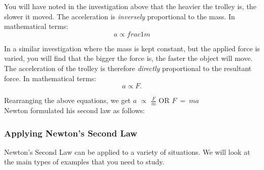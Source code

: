 You will have noted in the investigation above that the heavier the trolley is, the slower it moved. The acceleration is \textit{inversely} proportional to the mass. In mathematical terms:
\begin{equation*}
a \propto frac{1}{m}
\end{equation*}

In a similar investigation where the mass is kept constant, but the applied force is varied, you will find that the bigger the force is, the faster the object will move. The acceleration of the trolley is therefore \textit{directly} proportional to the resultant force. In mathematical terms:
\begin{equation*}
a \propto F.
\end{equation*}

Rearranging the above equations, we get $a$ $\propto$ $\frac{F}{m}$ OR $F~=~ma$\\

Newton formulated his second law as follows:\\

\subsubsection{Applying Newton's Second Law}
Newton's Second Law can be applied to a variety of situations. We will look at the main types of examples that you need to study.


